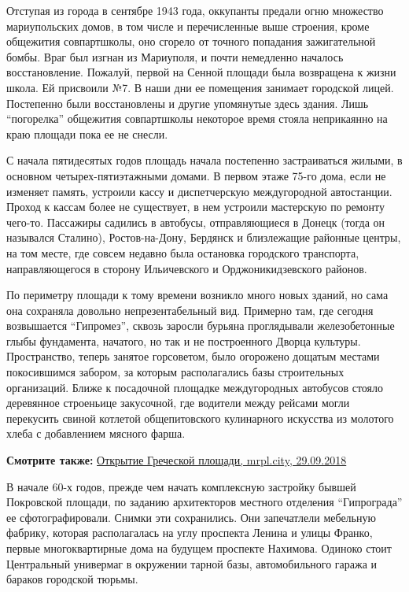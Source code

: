 Отступая из города в сентябре 1943 года, оккупанты предали огню множество
мариупольских домов, в том числе и перечисленные выше строения, кроме общежития
совпартшколы, оно сгорело от точного попадания зажигательной бомбы. Враг был
изгнан из Мариуполя, и почти немедленно началось восстановление. Пожалуй,
первой на Сенной площади была возвращена к жизни школа. Ей присвоили №7. В наши
дни ее помещения занимает городской лицей. Постепенно были восстановлены и
другие упомянутые здесь здания. Лишь \enquote{погорелка} общежития  совпартшколы
некоторое время стояла неприкаянно на краю площади пока ее не снесли.

С начала пятидесятых годов площадь начала постепенно застраиваться жилыми, в
основном четырех-пятиэтажными домами. В первом этаже 75-го дома, если не
изменяет память, устроили кассу и диспетчерскую междугородной автостанции.
Проход к кассам более не существует, в нем устроили мастерскую по ремонту
чего-то. Пассажиры садились в автобусы, отправляющиеся в Донецк (тогда он
назывался Сталино), Ростов-на-Дону, Бердянск и близлежащие районные центры, на
том месте, где совсем недавно была остановка городского транспорта,
направляющегося в сторону Ильичевского и Орджоникидзевского районов.

По периметру площади к тому времени возникло много новых зданий, но сама она
сохраняла довольно непрезентабельный вид. Примерно там, где сегодня возвышается
\enquote{Гипромез}, сквозь заросли бурьяна проглядывали железобетонные глыбы
фундамента, начатого, но так и не построенного Дворца культуры. Пространство,
теперь занятое горсоветом, было огорожено дощатым местами покосившимся забором,
за которым располагались базы строительных организаций. Ближе к посадочной
площадке междугородных автобусов стояло деревянное строеньице закусочной, где
водители между рейсами могли перекусить свиной котлетой общепитовского
кулинарного искусства из молотого хлеба с добавлением мясного фарша.

\textbf{Смотрите также:} \href{https://mrpl.city/news/view/otkrytie-grecheskoj-ploshhadi}{Открытие Греческой площади, mrpl.city, 29.09.2018}


В начале 60-х годов, прежде чем начать комплексную застройку бывшей Покровской
площади, по заданию архитекторов местного отделения \enquote{Гипрограда} ее
сфотографировали. Снимки эти сохранились. Они запечатлели мебельную фабрику,
которая располагалась на углу проспекта Ленина и улицы Франко, первые
многоквартирные дома на будущем проспекте Нахимова. Одиноко стоит Центральный
универмаг в окружении тарной базы, автомобильного гаража и бараков городской
тюрьмы.


